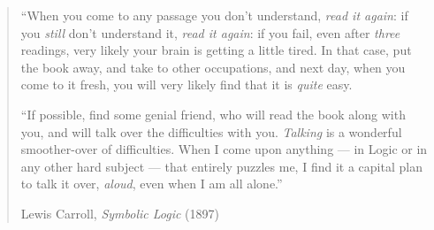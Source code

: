 \documentclass[oneside,11pt,letterpaper]{memoir}
\begin{document}
\midsloppy



\frontmatter




\newpage




\tableofcontents*

\newpage

\thispagestyle{empty}
\begin{quote}
``When you come to any passage you don't understand, \emph{read it again}: if you \emph{still} don't understand it, \emph{read it again}: if you fail, even after \emph{three} readings, very likely your brain is getting a little tired. In that case, put the book away, and take to other occupations, and next day, when you come to it fresh, you will very likely find that it is \emph{quite} easy.

``If possible, find some genial friend, who will read the book along with you, and will talk over the difficulties with you. \emph{Talking} is a wonderful smoother-over of difficulties. When I come upon anything --- in Logic or in any other hard subject --- that entirely puzzles me, I find it a capital plan to talk it over, \emph{aloud}, even when I am all alone.''

\begin{flushright} Lewis Carroll,  \emph{Symbolic Logic} (1897) \end{flushright}
\end{quote}



\mainmatter








\end{document}
